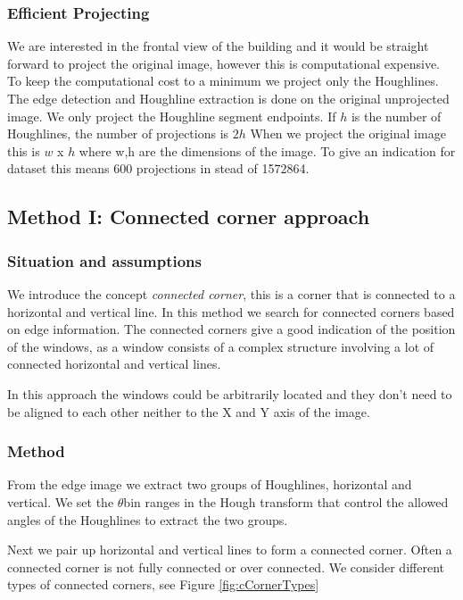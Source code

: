 \subsubsection{Efficient Projecting} 
We are interested in the frontal view of the building and it would be straight
forward to project the original image, however this is computational
expensive. To keep the computational cost to a minimum we project only the
Houghlines. The edge detection and Houghline extraction is done on the original
unprojected image. We only project the Houghline segment
endpoints. If $h$ is the number of Houghlines, the number of projections is $2h$
When we project the original image this is $w$ x $h$ where w,h are the dimensions of
the image. To give an indication for dataset %
this means 600 projections in stead of 1572864.

\subsection{Method I: Connected corner approach} 
\subsubsection{Situation and assumptions}
We introduce the concept \emph{connected corner}, this is a corner that is 
connected to a horizontal and vertical line.  
In this method we search for connected corners based on edge information.
The connected corners give a good indication of the position of the windows, as 
a window consists of a complex structure involving a lot of connected horizontal
and vertical lines. 

In this approach the windows could be arbitrarily located and they don't need
to be aligned to each other neither to the X and Y axis of the image.

\subsubsection{Method}
From the edge image we extract two groups of Houghlines, horizontal and
vertical.  We set the $\theta$bin ranges in the Hough transform that control the
allowed angles of the Houghlines to extract the two groups.

Next we pair up horizontal and vertical lines to form a connected corner.
Often a connected corner is not fully connected or over connected.
We consider different types of connected corners, see Figure \ref{fig:cCornerTypes} 

